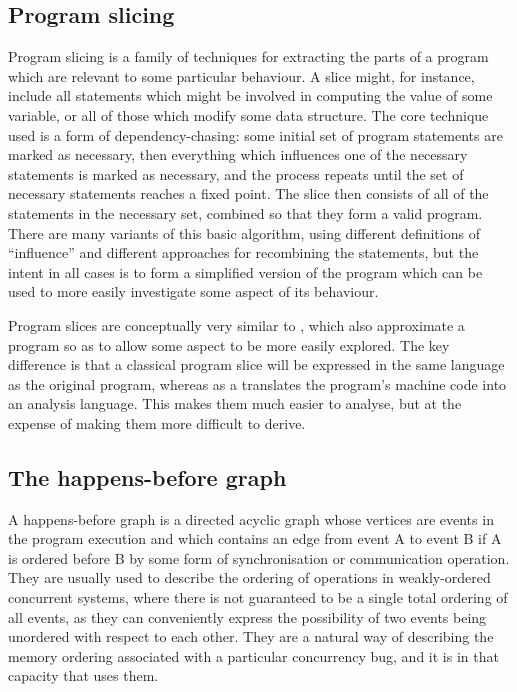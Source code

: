 \subsection{Program slicing}

Program slicing\cite{Weiser1981} is a family of techniques for
extracting the parts of a program which are relevant to some
particular behaviour.  A slice might, for instance, include all
statements which might be involved in computing the value of some
variable, or all of those which modify some data structure.  The core
technique used is a form of dependency-chasing: some initial set of
program statements are marked as necessary, then everything which
influences one of the necessary statements is marked as necessary, and
the process repeats until the set of necessary statements reaches a
fixed point.  The slice then consists of all of the statements in the
necessary set, combined so that they form a valid program.  There are
many variants of this basic algorithm, using different definitions of
``influence'' and different approaches for recombining the statements,
but the intent in all cases is to form a simplified version of the
program which can be used to more easily investigate some aspect of
its behaviour.

Program slices are conceptually very similar to {\StateMachines},
which also approximate a program so as to allow some aspect to be more
easily explored.  The key difference is that a classical program slice
will be expressed in the same language as the original program,
whereas as a {\StateMachine} translates the program's machine code
into an analysis language.  This makes them much easier to analyse,
but at the expense of making them more difficult to derive.

\subsection{The happens-before graph}

A happens-before graph\needCite{} is a directed acyclic graph whose
vertices are events in the program execution and which contains an
edge from event A to event B if A is ordered before B by some form of
synchronisation or communication operation.  They are usually used to
describe the ordering of operations in weakly-ordered concurrent
systems, where there is not guaranteed to be a single total ordering
of all events, as they can conveniently express the possibility of two
events being unordered with respect to each other.  They are a natural
way of describing the memory ordering associated with a particular
concurrency bug, and it is in that capacity that {\technique} uses
them.

